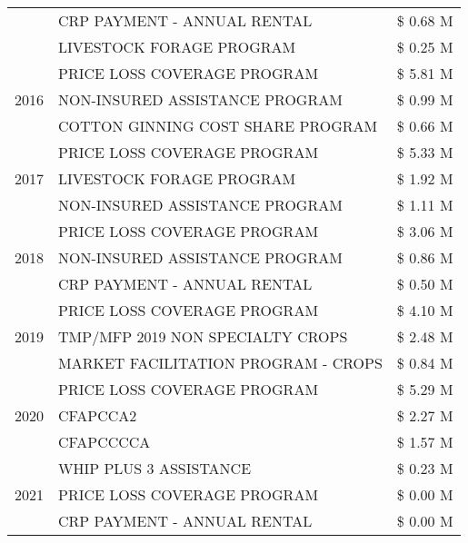 \begin{tabular}{llr}
 & CRP PAYMENT - ANNUAL RENTAL & \$ 0.68 M \\
 & LIVESTOCK FORAGE PROGRAM & \$ 0.25 M \\
\cline{1-3}
\multirow[t]{3}{*}{2016} & PRICE LOSS COVERAGE PROGRAM                   & \$ 5.81 M \\
 & NON-INSURED ASSISTANCE PROGRAM                & \$ 0.99 M \\
 & COTTON GINNING COST SHARE PROGRAM             & \$ 0.66 M \\
\cline{1-3}
\multirow[t]{3}{*}{2017} & PRICE LOSS COVERAGE PROGRAM & \$ 5.33 M \\
 & LIVESTOCK FORAGE PROGRAM & \$ 1.92 M \\
 & NON-INSURED ASSISTANCE PROGRAM & \$ 1.11 M \\
\cline{1-3}
\multirow[t]{3}{*}{2018} & PRICE LOSS COVERAGE PROGRAM & \$ 3.06 M \\
 & NON-INSURED ASSISTANCE PROGRAM & \$ 0.86 M \\
 & CRP PAYMENT - ANNUAL RENTAL & \$ 0.50 M \\
\cline{1-3}
\multirow[t]{3}{*}{2019} & PRICE LOSS COVERAGE PROGRAM & \$ 4.10 M \\
 & TMP/MFP 2019 NON SPECIALTY CROPS & \$ 2.48 M \\
 & MARKET FACILITATION PROGRAM - CROPS & \$ 0.84 M \\
\cline{1-3}
\multirow[t]{3}{*}{2020} & PRICE LOSS COVERAGE PROGRAM & \$ 5.29 M \\
 & CFAPCCA2 & \$ 2.27 M \\
 & CFAPCCCCA & \$ 1.57 M \\
\cline{1-3}
\multirow[t]{3}{*}{2021} & WHIP PLUS 3 ASSISTANCE & \$ 0.23 M \\
 & PRICE LOSS COVERAGE PROGRAM & \$ 0.00 M \\
 & CRP PAYMENT - ANNUAL RENTAL & \$ 0.00 M \\
\cline{1-3}
\bottomrule
\end{tabular}
